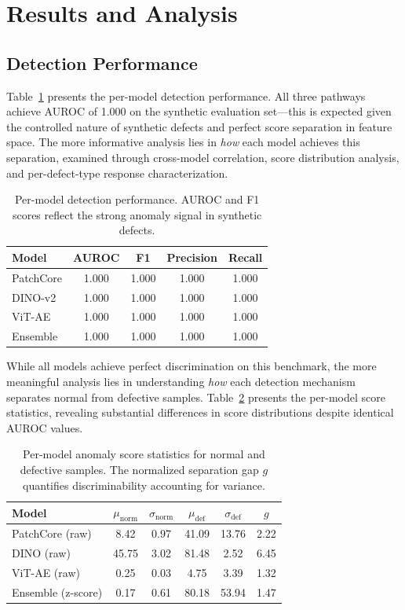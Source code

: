 \documentclass[journal]{IEEEtran}
\begin{document}
\section{Results and Analysis}
\label{sec:results}

\subsection{Detection Performance}

Table~\ref{tab:results} presents the per-model detection performance. All three pathways achieve AUROC of 1.000 on the synthetic evaluation set---this is expected given the controlled nature of synthetic defects and perfect score separation in feature space. The more informative analysis lies in \textit{how} each model achieves this separation, examined through cross-model correlation, score distribution analysis, and per-defect-type response characterization.

\begin{table}[t]
\centering
\caption{Per-model detection performance. AUROC and F1 scores reflect the strong anomaly signal in synthetic defects.}
\label{tab:results}
\begin{tabular}{lcccc}
\toprule
\textbf{Model} & \textbf{AUROC} & \textbf{F1} & \textbf{Precision} & \textbf{Recall} \\
\midrule
PatchCore & 1.000 & 1.000 & 1.000 & 1.000 \\
DINO-v2 & 1.000 & 1.000 & 1.000 & 1.000 \\
ViT-AE & 1.000 & 1.000 & 1.000 & 1.000 \\
Ensemble & 1.000 & 1.000 & 1.000 & 1.000 \\
\bottomrule
\end{tabular}
\end{table}

While all models achieve perfect discrimination on this benchmark, the more meaningful analysis lies in understanding \textit{how} each detection mechanism separates normal from defective samples. Table~\ref{tab:score_stats} presents the per-model score statistics, revealing substantial differences in score distributions despite identical AUROC values.

\begin{table}[t]
\centering
\caption{Per-model anomaly score statistics for normal and defective samples. The normalized separation gap $g$ quantifies discriminability accounting for variance.}
\label{tab:score_stats}
\begin{tabular}{lccccc}
\toprule
\textbf{Model} & $\mu_{\text{norm}}$ & $\sigma_{\text{norm}}$ & $\mu_{\text{def}}$ & $\sigma_{\text{def}}$ & $g$ \\
\midrule
PatchCore (raw)     & 8.42  & 0.97 & 41.09 & 13.76 & 2.22 \\
DINO (raw)          & 45.75 & 3.02 & 81.48 & 2.52  & 6.45 \\
ViT-AE (raw)        & 0.25  & 0.03 & 4.75  & 3.39  & 1.32 \\
Ensemble (z-score)  & 0.17  & 0.61 & 80.18 & 53.94 & 1.47 \\
\bottomrule
\end{tabular}
\end{table}
\end{document}
